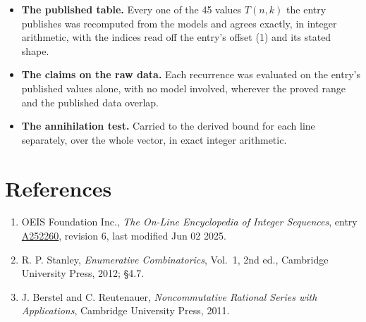 \documentclass[11pt]{article}
\theoremstyle{definition}
\begin{document}
\begin{itemize}

\item {\bfseries The published table.} Every one of the 45 values $T(n,k)$ the entry publishes was recomputed from the models and agrees exactly, in integer arithmetic, with the indices read off the entry's offset (1) and its stated shape.

\item {\bfseries The claims on the raw data.} Each recurrence was evaluated on the entry's published values alone, with no model involved, wherever the proved range and the published data overlap.

\item {\bfseries The annihilation test.} Carried to the derived bound for each line separately, over the whole vector, in exact integer arithmetic.

\end{itemize}

\section{References}

\begin{enumerate}

\item OEIS Foundation Inc., \emph{The On-Line Encyclopedia of Integer Sequences}, entry \href{https://oeis.org/A252260}{A252260}, revision 6, last modified Jun 02 2025.

\item R. P. Stanley, \emph{Enumerative Combinatorics}, Vol.~1, 2nd ed., Cambridge University Press, 2012; \S4.7.

\item J. Berstel and C. Reutenauer, \emph{Noncommutative Rational Series with Applications}, Cambridge University Press, 2011.

\end{enumerate}
\end{document}
